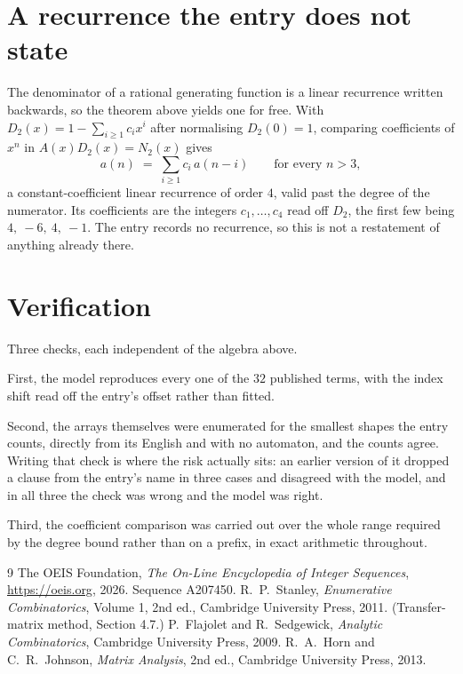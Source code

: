 \documentclass[11pt,a4paper]{article}
\theoremstyle{plain}
\theoremstyle{definition}
\begin{document}
\section{A recurrence the entry does not state}

The denominator of a rational generating function is a linear recurrence written backwards, so
the theorem above yields one for free. With $D_2(x)=1-\sum_{i\ge1}c_ix^i$ after normalising
$D_2(0)=1$, comparing coefficients of $x^n$ in $A(x)D_2(x)=N_2(x)$ gives
\[
a(n)\;=\;\sum_{i\ge1}c_i\,a(n-i)\qquad\text{for every }n>3,
\]
a constant-coefficient linear recurrence of order $4$, valid past the degree of the
numerator. Its coefficients are the integers $c_1,\dots,c_{4}$ read off $D_2$, the first few being $4,\ -6,\ 4,\ -1$. The entry records no recurrence, so this is not a restatement of anything
already there.

\section{Verification}

Three checks, each independent of the algebra above.

First, the model reproduces every one of the $32$ published terms, with the index shift
read off the entry's offset rather than fitted.

Second, the arrays themselves were enumerated for the smallest shapes the entry counts,
directly from its English and with no automaton, and the counts agree. Writing that check is
where the risk actually sits: an earlier version of it dropped a clause from the entry's name
in three cases and disagreed with the model, and in all three the check was wrong and the model
was right.

Third, the coefficient comparison was carried out over the whole range required by the degree
bound rather than on a prefix, in exact arithmetic throughout.

\begin{thebibliography}{9}
 The OEIS Foundation, \emph{The On-Line Encyclopedia of Integer
Sequences}, \url{https://oeis.org}, 2026. Sequence A207450.
 R.~P.~Stanley, \emph{Enumerative Combinatorics}, Volume 1, 2nd ed.,
Cambridge University Press, 2011. (Transfer-matrix method, Section 4.7.)
 P.~Flajolet and R.~Sedgewick, \emph{Analytic Combinatorics}, Cambridge
University Press, 2009.
 R.~A.~Horn and C.~R.~Johnson, \emph{Matrix Analysis}, 2nd ed., Cambridge
University Press, 2013.
\end{thebibliography}
\end{document}
